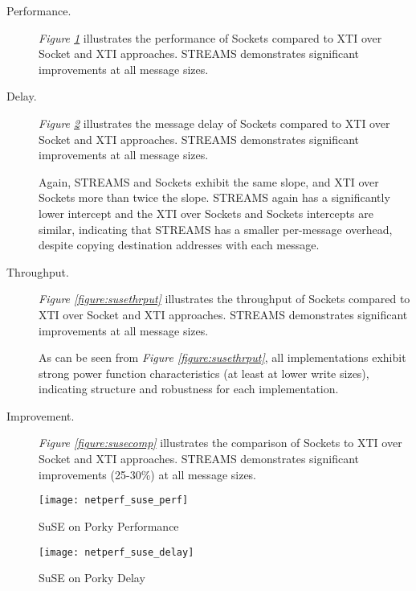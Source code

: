 \documentclass[letterpaper,final,notitlepage,twocolumn,10pt,twoside]{article}
\begin{document}
\begin{description}

\item[Performance.]

\textit{Figure \ref{figure:suseperf}}
illustrates the performance of Sockets compared to XTI over Socket and XTI
approaches.  STREAMS demonstrates significant improvements at all message
sizes.

\item[Delay.]

\textit{Figure \ref{figure:susedly}} illustrates
the message delay of Sockets compared to XTI over Socket and XTI approaches.
STREAMS demonstrates significant improvements at all message sizes.

Again, STREAMS and Sockets exhibit the same slope, and XTI over Sockets more
than twice the slope.  STREAMS again has a significantly lower intercept and
the XTI over Sockets and Sockets intercepts are similar, indicating that
STREAMS has a smaller per-message overhead, despite copying destination
addresses with each message.

\item[Throughput.]

\textit{Figure \ref{figure:susethrput}}
illustrates the throughput of Sockets compared to XTI over Socket and XTI
approaches.  STREAMS demonstrates significant improvements at all message
sizes.

As can be seen from \textit{Figure \ref{figure:susethrput}}, all
implementations exhibit strong power function characteristics (at least at
lower write sizes), indicating structure and robustness for each
implementation.

\item[Improvement.]

\textit{Figure \ref{figure:susecomp}}
illustrates the comparison of Sockets to XTI over Socket and XTI approaches.
STREAMS demonstrates significant improvements (25-30\%) at all message sizes.

\end{description}

\begin{figure}[p]
\center\texttt{[image: netperf\_suse\_perf]}
\caption[SuSE on Porky Performance]{SuSE on Porky Performance}
\label{figure:suseperf}
\end{figure}

\begin{figure}[p]
\center\texttt{[image: netperf\_suse\_delay]}
\caption[SuSE on Porky Delay]{SuSE on Porky Delay}
\label{figure:susedly}
\end{figure}
\end{document}
